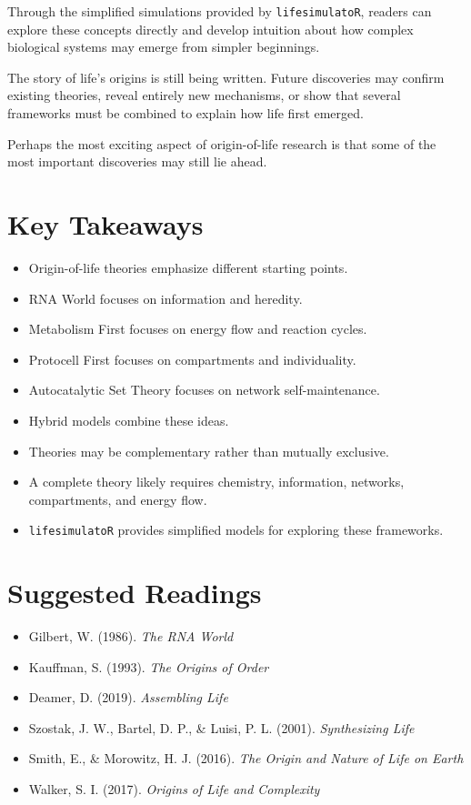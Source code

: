 \documentclass[
  oneside,
  openany]{book}
\providecommand{\tightlist}{%
  \setlength{\itemsep}{0pt}\setlength{\parskip}{0pt}}
\begin{document}
Through the simplified simulations provided by \texttt{lifesimulatoR}, readers can explore these concepts directly and develop intuition about how complex biological systems may emerge from simpler beginnings.

The story of life's origins is still being written. Future discoveries may confirm existing theories, reveal entirely new mechanisms, or show that several frameworks must be combined to explain how life first emerged.

Perhaps the most exciting aspect of origin-of-life research is that some of the most important discoveries may still lie ahead.

\section{Key Takeaways}\label{key-takeaways-4}

\begin{itemize}
\tightlist
\item
  Origin-of-life theories emphasize different starting points.
\item
  RNA World focuses on information and heredity.
\item
  Metabolism First focuses on energy flow and reaction cycles.
\item
  Protocell First focuses on compartments and individuality.
\item
  Autocatalytic Set Theory focuses on network self-maintenance.
\item
  Hybrid models combine these ideas.
\item
  Theories may be complementary rather than mutually exclusive.
\item
  A complete theory likely requires chemistry, information, networks, compartments, and energy flow.
\item
  \texttt{lifesimulatoR} provides simplified models for exploring these frameworks.
\end{itemize}

\section{Suggested Readings}\label{suggested-readings-4}

\begin{itemize}
\tightlist
\item
  Gilbert, W. (1986). \emph{The RNA World}
\item
  Kauffman, S. (1993). \emph{The Origins of Order}
\item
  Deamer, D. (2019). \emph{Assembling Life}
\item
  Szostak, J. W., Bartel, D. P., \& Luisi, P. L. (2001). \emph{Synthesizing Life}
\item
  Smith, E., \& Morowitz, H. J. (2016). \emph{The Origin and Nature of Life on Earth}
\item
  Walker, S. I. (2017). \emph{Origins of Life and Complexity}
\end{itemize}
\end{document}
